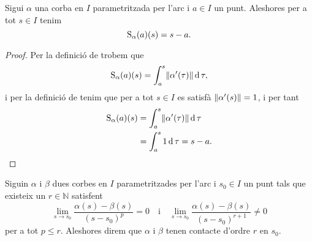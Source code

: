 \documentclass[../../Main.tex]{subfiles}
\begin{document}
	\begin{observation}
		Sigui \(\alpha\) una corba en \(I\) parametritzada per l'arc i \(a\in I\) un punt. Aleshores per a tot \(s\in I\) tenim
		\[\operatorname{S}_{\alpha}(a)(s)=s-a.\]
		\begin{proof}
			Per la definició de  trobem que
			\[\funciolongituddarc_{\alpha}(a)(s)=\int_{a}^{s}\norm{\alpha'(\tau)}\diff\tau,\]
			i per la definició de  tenim que  per a tot \(s\in I\) es satisfà \(\norm{\alpha'(s)}=1\), i per tant
			\begin{align*}
				\funciolongituddarc_{\alpha}(a)(s)&=\int_{a}^{s}\norm{\alpha'(\tau)}\diff\tau \\
				&=\int_{a}^{s}1\diff\tau=s-a.\qedhere
			\end{align*}
		\end{proof}
	\end{observation}
	\begin{definition}[Contacte]
		\label{def:contacte entre dues corbes parametritzades per l'arc}
		Siguin \(\alpha\) i \(\beta\) dues corbes en \(I\) parametritzades per l'arc i \(s_{0}\in I\) un punt tals que existeix un \(r\in\mathbb{N}\) satisfent
		\[\lim_{s\to s_{0}}\frac{\alpha(s)-\beta(s)}{(s-s_{0})^{p}}=0\quad\text{i}\quad\lim_{s\to s_{0}}\frac{\alpha(s)-\beta(s)}{(s-s_{0})^{r+1}}\neq0\]
		per a tot \(p\leq r\). Aleshores direm que \(\alpha\) i \(\beta\) tenen contacte d'ordre \(r\) en \(s_{0}\).
	\end{definition}
\end{document}
